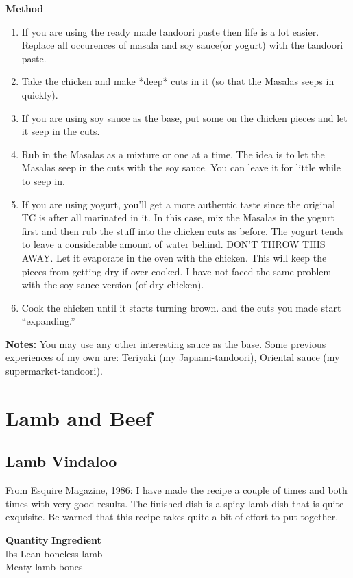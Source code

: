 {\bf Method}
\begin{enumerate}
\item If you are using the ready made tandoori paste then life is a
lot easier. Replace all occurences of masala and soy sauce(or yogurt)
with the tandoori paste.
\item
 Take the chicken and make *deep* cuts in it (so that the Masalas seeps in quickly). 
\item
If you are using soy sauce as the base, put some on the chicken pieces and let it seep in the cuts. 
\item Rub in the Masalas as a mixture or one at a time. The idea is to let
the Masalas seep in the cuts with the soy sauce. You can leave it
for little while to seep in.
\item If you are using yogurt, you'll get a more authentic taste since
the original TC is after all marinated in it. In this case, mix the
Masalas in the yogurt first and then rub the stuff into the chicken
cuts as before. The yogurt tends to leave a considerable amount of
water behind. DON'T THROW THIS AWAY. Let it evaporate in the oven
with the chicken. This will keep the pieces from getting dry if
over-cooked. I have not faced the same problem with the soy sauce 
version (of dry chicken). 
\item Cook the chicken until it starts turning brown.
and the cuts you made start ``expanding.''
\end{enumerate} 

{\bf Notes:}
You may use any other interesting sauce as the base. Some previous
experiences of my own are: Teriyaki (my Japaani-tandoori), Oriental
sauce (my supermarket-tandoori).

\chapter{Lamb and Beef}

\section{Lamb Vindaloo}
  From Esquire Magazine, 1986:  
I have made the recipe a couple of times and both times with very good results.  The
finished  dish  is  a  spicy lamb dish that is quite exquisite.  Be warned that
this recipe takes quite a bit of effort to put together.

\begin{tabbing}
\hspace{1.0cm}  \={\bf Quantity}   \hspace{3.0cm} \={\bf Ingredient}\\
    lbs\> Lean boneless lamb\\
\> Meaty lamb bones
\end{tabbing}

